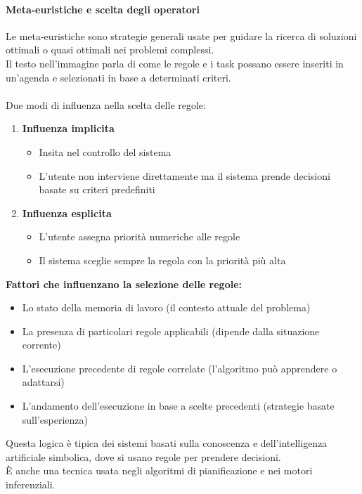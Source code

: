\documentclass[../main.tex]{subfiles}
\begin{document}
	\paragraph{Meta-euristiche e scelta degli operatori}
	Le meta-euristiche sono strategie generali usate per guidare la ricerca di soluzioni ottimali o quasi ottimali nei problemi complessi. \\
	Il testo nell’immagine parla di come le regole e i task possano essere inseriti in un’agenda e selezionati in base a determinati criteri.\\\\
	Due modi di influenza nella scelta delle regole:
	\begin{enumerate}
		\item \textbf{Influenza implicita}
		\begin{itemize}
			\item Insita nel controllo del sistema
			\item L’utente non interviene direttamente ma il sistema prende decisioni basate su criteri predefiniti
		\end{itemize}
		\item \textbf{Influenza esplicita}
		\begin{itemize}
			\item L’utente assegna priorità numeriche alle regole
			\item Il sistema sceglie sempre la regola con la priorità più alta
		\end{itemize}
	\end{enumerate}
	\textbf{Fattori che influenzano la selezione delle regole:}
	\begin{itemize}
		\item Lo stato della memoria di lavoro (il contesto attuale del problema)
		\item La presenza di particolari regole applicabili (dipende dalla situazione corrente)
		\item L’esecuzione precedente di regole correlate (l’algoritmo può apprendere o adattarsi)
		\item L’andamento dell’esecuzione in base a scelte precedenti (strategie basate sull'esperienza)
	\end{itemize}
	Questa logica è tipica dei sistemi basati sulla conoscenza e dell’intelligenza artificiale simbolica, dove si usano regole per prendere decisioni. \\
	È anche una tecnica usata negli algoritmi di pianificazione e nei motori inferenziali.
\end{document}
